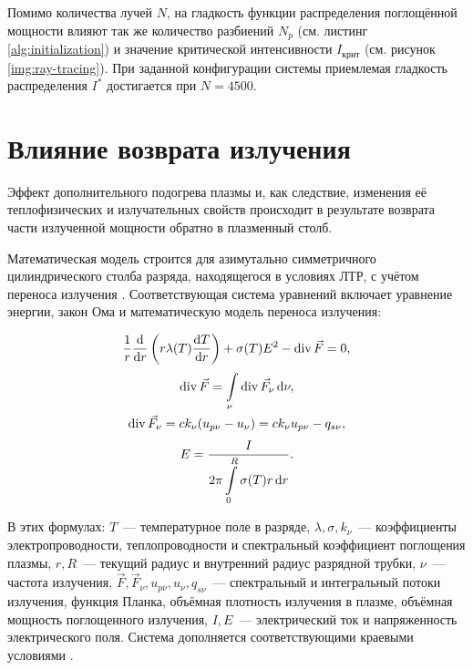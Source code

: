 Помимо количества лучей $N$, на гладкость функции распределения поглощённой мощности влияют так же количество разбиений $N_p$ (см. листинг \ref{alg:initialization}) и значение критической интенсивности $I_{\text{крит}}$ (см. рисунок \ref{img:ray-tracing}).
При заданной конфигурации системы приемлемая гладкость распределения $I^*$ достигается при $N = 4500$.

\pagebreak

\section{Влияние возврата излучения}

Эффект дополнительного подогрева плазмы и, как следствие, изменения её теплофизических и излучательных свойств происходит в результате возврата части излученной мощности обратно в плазменный столб.

Математическая модель строится для азимутально симметричного цилиндрического столба разряда, находящегося в условиях ЛТР, с учётом переноса излучения \cite{kerimov-2}.
Соответствующая система уравнений включает уравнение энергии, закон Ома и математическую модель переноса излучения:

\begin{equation}
	\label{eqn:article-1}
	\frac1r\frac{\mathrm d}{\mathrm dr} \left( r \lambda(T) \frac{\mathrm dT}{\mathrm dr} \right) + \sigma(T)E^2 - \operatorname{div}{\vec F = 0},
\end{equation}
\begin{equation}
	\label{eqn:article-2}
	\begin{gathered}
		\operatorname{div}{\vec F} = \int\displaylimits_\nu \operatorname{div}{\vec F_\nu} \,\mathrm d\nu, \\
		\operatorname{div}{\vec F_\nu} = ck_{\nu}(u_{p\nu} - u_{\nu}) = ck_{\nu}u_{p\nu} - q_{s\nu}, \\
	\end{gathered}
\end{equation}
\begin{equation}
	\label{eqn:article-3}
	E = \frac{I}{\displaystyle 2\pi\int\displaylimits_0^R \sigma(T) r\,\mathrm dr}.
\end{equation}

В этих формулах: $T$~— температурное поле в разряде, $\lambda, \sigma, k_\nu$~— коэффициенты электропроводности, теплопроводности и спектральный коэффициент поглощения плазмы, $r, R$~— текущий радиус и внутренний радиус разрядной трубки, $\nu$~— частота излучения, $\vec F, \vec F_\nu, u_{p\nu}, u_{\nu}, q_{s\nu}$~— спектральный и интегральный потоки излучения, функция Планка, объёмная плотность излучения в плазме, объёмная мощность поглощенного излучения, $I, E$~— электрический ток и напряженность электрического поля.
Система дополняется соответствующими краевыми условиями \cite{gradov-dissertation}.


